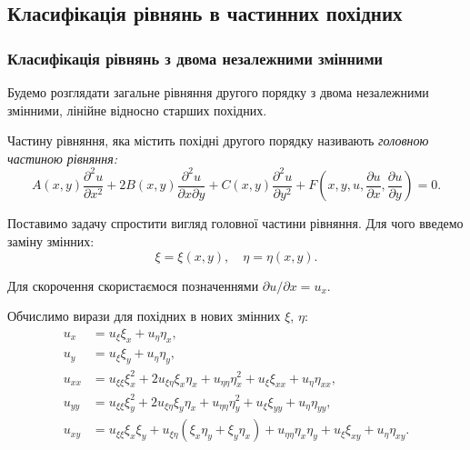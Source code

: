 % 


% 

% 



\subsection{Класифікація рівнянь в частинних похідних}

\subsubsection{Класифікація рівнянь з двома незалежними змінними}

Будемо розглядати загальне рівняння другого порядку з двома незалежними змінними, лінійне відносно старших похідних.
\begin{definition}
	Частину рівняння, яка містить похідні другого порядку називають \it{головною} частиною рівняння:
	\begin{equation}
		A(x,y)\dfrac{\partial^2u}{\partial x^2}+2B(x,y)\dfrac{\partial^2u}{\partial x\partial y}+C(x,y)\dfrac{\partial^2u}{\partial y^2}+F\left(x,y,u,\dfrac{\partial u}{\partial x},\dfrac{\partial u}{\partial y}\right)=0.
	\end{equation}
\end{definition}

Поставимо задачу спростити вигляд головної частини рівняння. Для чого введемо заміну змінних: 
\begin{equation}
	\xi = \xi(x, y), \quad \eta = \eta(x, y).
\end{equation}

Для скорочення скористаємося позначеннями $\partial u / \partial x = u_x$. \medskip

Обчислимо вирази для похідних в нових змінних $\xi$, $\eta$:
\begin{align}
	u_x &= u_\xi \xi_x + u_\eta \eta_x, \\
	u_y &= u_\xi \xi_y + u_\eta \eta_y, \\
	u_{xx} &= u_{\xi\xi} \xi_x^2 + 2 u_{\xi\eta} \xi_x \eta_x + u_{\eta\eta} \eta_x^2 + u_\xi \xi_{xx} + u_\eta \eta_{xx}, \\
	u_{yy} &= u_{\xi\xi} \xi_y^2 + 2 u_{\xi\eta} \xi_y \eta_x + u_{\eta\eta} \eta_y^2 + u_\xi \xi_{yy} + u_\eta \eta_{yy}, \\
	u_{xy} &= u_{\xi\xi} \xi_x \xi_y + u_{\xi\eta} (\xi_x \eta_y + \xi_y \eta_x) + u_{\eta\eta} \eta_x \eta_y + u_\xi \xi_{xy} + u_\eta \eta_{xy}.
\end{align}

